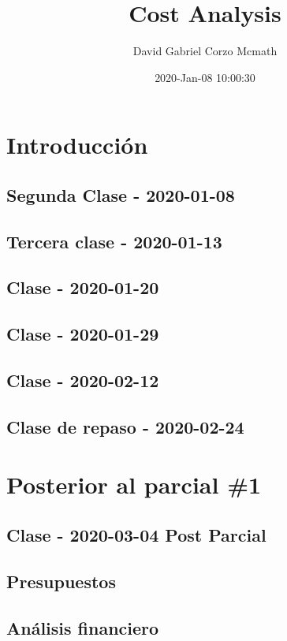 \documentclass[openany]{book}
\title{Cost Analysis}
\author{David Gabriel Corzo Mcmath}
\date{2020-Jan-08 10:00:30}
\begin{document}
\maketitle
\tableofcontents

\part{Introducción} 
\chapter{Segunda Clase - 2020-01-08}


\chapter{Tercera clase - 2020-01-13}


\chapter{Clase - 2020-01-20}


\chapter{Clase - 2020-01-29}


\chapter{Clase - 2020-02-12}


\chapter{Clase de repaso - 2020-02-24}



\part{Posterior al parcial \#1} 

\chapter{Clase - 2020-03-04 Post Parcial}


\chapter{Presupuestos} %




\chapter{Análisis financiero}

\end{document}
